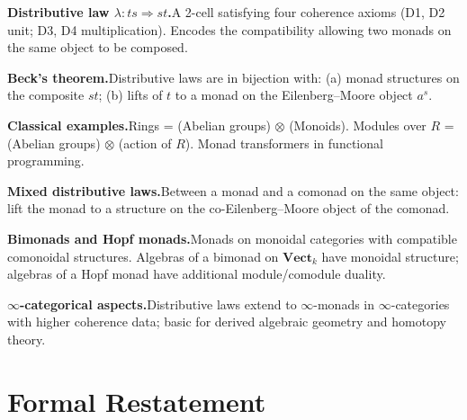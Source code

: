 \begin{summarybox}
\textbf{Distributive law $\lambda : ts \Rightarrow st$.}\quad A 2-cell
satisfying four coherence axioms (D1, D2 unit; D3, D4 multiplication).
Encodes the compatibility allowing two monads on the same object to be
composed.

\textbf{Beck's theorem.}\quad Distributive laws are in bijection with: (a)
monad structures on the composite $st$; (b) lifts of $t$ to a monad on the
Eilenberg--Moore object $a^s$.

\textbf{Classical examples.}\quad Rings = (Abelian groups) $\otimes$
(Monoids). Modules over $R$ = (Abelian groups) $\otimes$ (action of $R$).
Monad transformers in functional programming.

\textbf{Mixed distributive laws.}\quad Between a monad and a comonad on the
same object: lift the monad to a structure on the co-Eilenberg--Moore
object of the comonad.

\textbf{Bimonads and Hopf monads.}\quad Monads on monoidal categories with
compatible comonoidal structures. Algebras of a bimonad on
$\mathbf{Vect}_k$ have monoidal structure; algebras of a Hopf monad have
additional module/comodule duality.

\textbf{$\infty$-categorical aspects.}\quad Distributive laws extend to
$\infty$-monads in $\infty$-categories with higher coherence data; basic
for derived algebraic geometry and homotopy theory.
\end{summarybox}


\section*{Formal Restatement}

